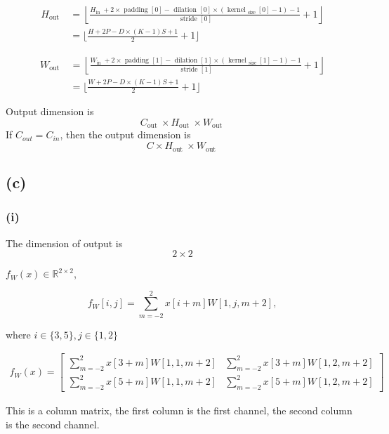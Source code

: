 \begin{enumerate}[(a)]
\begin{align}
    H_{\text {out }}
    &=\left\lfloor\frac{H_{\text {in }}+2 \times \text { padding }[0]-\text { dilation }[0] \times\left(\text { kernel }_{\text {size }}[0]-1\right)-1}{\text { stride }[0]}+1\right\rfloor \\
    &=
    \lfloor
        \frac{ H+2P-D \times (K-1){S}+1}
        {2}
        +1
    \rfloor
\end{align}

\begin{align}
    W_{\text {out }}&=\left\lfloor\frac{W_{\text {in }}+2 \times \text { padding }[1]-\text { dilation }[1] \times\left(\text { kernel }_{\text {size }}[1]-1\right)-1}{\text { stride }[1]}+1\right\rfloor \\
    &= 
    \lfloor
        \frac{ W+2P-D \times (K-1){S}+1}
        {2}
        +1
    \rfloor
\end{align}


Output dimension is 
$$
C_{\text {out }} \times H_{\text {out }} \times W_{\text {out }} 
$$
If $C_{out} = C_{in}$, then the output dimension is
$$
C \times H_{\text {out }} \times W_{\text {out }}
$$


\subsection*{(c)}
\subsubsection*{(i)}


The dimension of output is 
$$
2 \times 2
$$

$f_W(x) \in \mathbb{R}^{2 \times 2}$,

\begin{equation}
    f_W[i,j] = \sum_{m=-2}^2 x[i + m]W[1,j, m+2],
\end{equation}

where $i \in \{3,5\}, j \in \{1, 2\}$

\begin{align}
    f_W(x)=
    \begin{bmatrix}
        \sum_{m=-2}^2 x[3 + m]W[1, 1, m+2] & \sum_{m=-2}^2 x[3 + m]W[1, 2, m+2] \\
        \sum_{m=-2}^2 x[5 + m]W[1, 1, m+2] & \sum_{m=-2}^2 x[5 + m]W[1, 2, m+2]
    \end{bmatrix}
\end{align}

This is a column matrix, the first column is the first channel, the second column is the second channel.



\end{enumerate}
